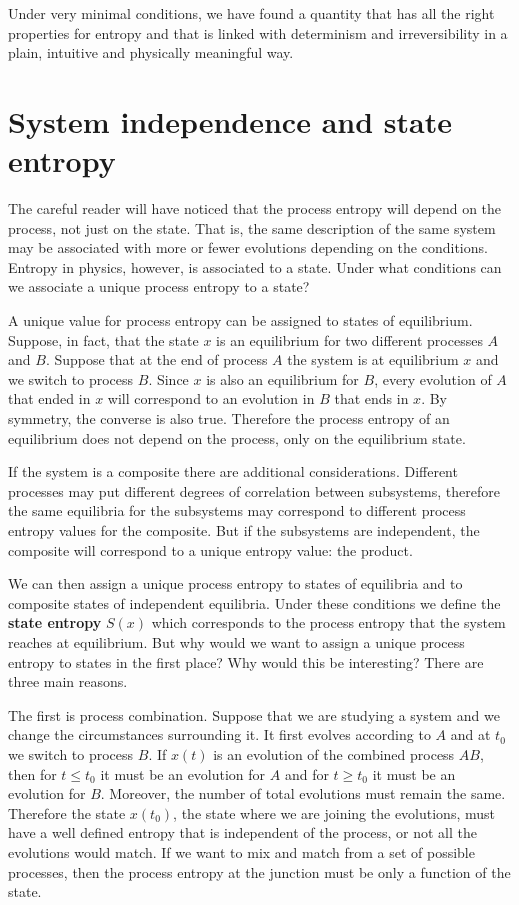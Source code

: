 \documentclass[letterpaper,twocolumn]{article}
\begin{document}
Under very minimal conditions, we have found a quantity that has all the right properties for entropy and that is linked with determinism and irreversibility in a plain, intuitive and physically meaningful way.

\section{System independence and state entropy}

The careful reader will have noticed that the process entropy will depend on the process, not just on the state. That is, the same description of the same system may be associated with more or fewer evolutions depending on the conditions. Entropy in physics, however, is associated to a state. Under what conditions can we associate a unique process entropy to a state?

A unique value for process entropy can be assigned to states of equilibrium. Suppose, in fact, that the state $x$ is an equilibrium for two different processes $A$ and $B$. Suppose that at the end of process $A$ the system is at equilibrium $x$ and we switch to process $B$. Since $x$ is also an equilibrium for $B$, every evolution of $A$ that ended in $x$ will correspond to an evolution in $B$ that ends in $x$. By symmetry, the converse is also true. Therefore the process entropy of an equilibrium does not depend on the process, only on the equilibrium state.

If the system is a composite there are additional considerations. Different processes may put different degrees of correlation between subsystems, therefore the same equilibria for the subsystems may correspond to different process entropy values for the composite. But if the subsystems are independent, the composite will correspond to a unique entropy value: the product.

We can then assign a unique process entropy to states of equilibria and to composite states of independent equilibria. Under these conditions we define the \textbf{state entropy} $S(x)$ which corresponds to the process entropy that the system reaches at equilibrium. But why would we want to assign a unique process entropy to states in the first place? Why would this be interesting? There are three main reasons.

The first is process combination. Suppose that we are studying a system and we change the circumstances surrounding it. It first evolves according to $A$ and at $t_0$ we switch to process $B$. If $x(t)$ is an evolution of the combined process $AB$, then for $t\leq t_0$ it must be an evolution for $A$ and for $t\geq t_0$ it must be an evolution for $B$. Moreover, the number of total evolutions must remain the same. Therefore the state $x(t_0)$, the state where we are joining the evolutions, must have a well defined entropy that is independent of the process, or not all the evolutions would match. If we want to mix and match from a set of possible processes, then the process entropy at the junction must be only a function of the state.
\end{document}
